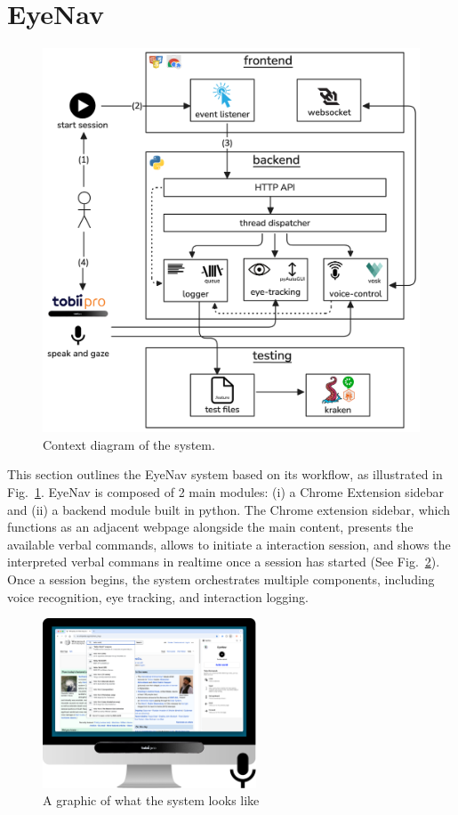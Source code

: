 
\section{EyeNav}

\begin{figure}[h]
	\centering
	\vspace{-10pt}
	\includegraphics[width=0.7\linewidth]{imgs/diagram-context.png}
	\caption{Context diagram of the system.}
	\label{fig:context}
\end{figure}

This section outlines the EyeNav system based on its workflow, as illustrated in Fig.~\ref{fig:context}. EyeNav is composed of 2 main modules: (i) a Chrome Extension sidebar and (ii) a backend module built in python. The Chrome extension sidebar, which functions as an adjacent webpage alongside the main content, presents the available verbal commands, allows to initiate a interaction session, and shows the interpreted verbal commans in realtime once a session has started (See Fig.~\ref{fig:requirements}). Once a session begins, the system orchestrates multiple components, including voice recognition, eye tracking, and interaction logging.

\begin{figure}[h]
	\centering
	\includegraphics[width=180pt]{imgs/system-requirements.png}
	\caption{A graphic of what the system looks like}
	\label{fig:requirements}
\end{figure}


